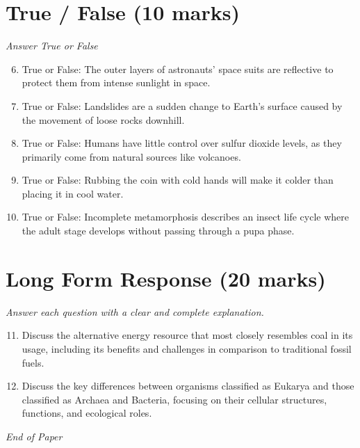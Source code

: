 \documentclass[12pt]{article}
\begin{document}
\section*{True / False (10 marks)}
\textit{Answer True or False}
\begin{enumerate}[label=\arabic*.]
\setcounter{enumi}{5}
\item True or False: The outer layers of astronauts' space suits are reflective to protect them from intense sunlight in space.
\item True or False: Landslides are a sudden change to Earth's surface caused by the movement of loose rocks downhill.
\item True or False: Humans have little control over sulfur dioxide levels, as they primarily come from natural sources like volcanoes.
\item True or False: Rubbing the coin with cold hands will make it colder than placing it in cool water.
\item True or False: Incomplete metamorphosis describes an insect life cycle where the adult stage develops without passing through a pupa phase.
\end{enumerate}

\section*{Long Form Response (20 marks)}
\textit{Answer each question with a clear and complete explanation.}
\begin{enumerate}[label=\arabic*.]
\setcounter{enumi}{10}
\item Discuss the alternative energy resource that most closely resembles coal in its usage, including its benefits and challenges in comparison to traditional fossil fuels.
\item Discuss the key differences between organisms classified as Eukarya and those classified as Archaea and Bacteria, focusing on their cellular structures, functions, and ecological roles.
\end{enumerate}

\vfill
\noindent\textit{End of Paper}
\end{document}
